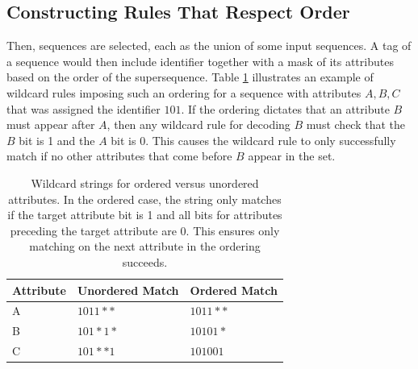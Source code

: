 
\subsection{Constructing Rules That Respect Order}
\label{s:order-rules}
Then, sequences are selected, each as the union of some input sequences. A tag of a sequence would then include identifier together with a mask of its attributes based on the order of the supersequence.  Table \ref{tab:ordering} illustrates an example of wildcard rules imposing such an ordering for a sequence with attributes $A, B, C$ that was assigned the identifier $101$.  If the ordering dictates that an attribute $B$ must appear after $A$, then any wildcard rule for decoding $B$ must check that the $B$ bit is 1 and the $A$ bit is 0. This causes the wildcard rule to only successfully match if no other attributes that come before $B$ appear in the set. %

 \begin{table}
    \begin{tabular}{| l | l | l |}
    \hline
    Attribute & Unordered Match & Ordered Match\\ \hline
    A & $1011**$ & $1011**$ \\ \hline
    B & $101*1*$ & $10101*$ \\ \hline
    C & $101**1$ & $101001$ \\
    \hline
    \end{tabular}
    \caption{Wildcard strings for ordered versus unordered attributes. %
     In the ordered case, the string only matches if the target attribute bit is 1 and all bits for attributes preceding the target attribute are 0. This ensures only matching on the next attribute in the ordering succeeds.} 
    \label{tab:ordering}
\end{table}